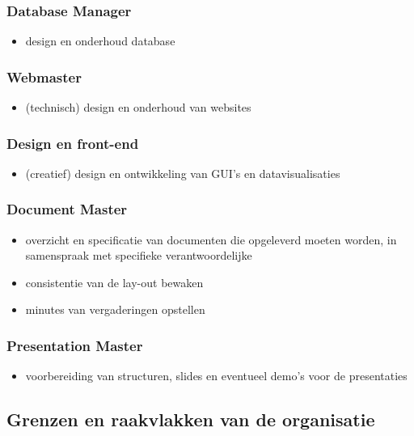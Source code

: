 \documentclass{article}
\begin{document}
\subsubsection*{Database Manager}
\begin{itemize}
\item design en onderhoud database
\end{itemize}

\subsubsection*{Webmaster}
\begin{itemize}
\item (technisch) design en onderhoud van websites
\end{itemize}

\subsubsection*{Design en front-end}
\begin{itemize}
\item (creatief) design en ontwikkeling van GUI's en datavisualisaties
\end{itemize}

\subsubsection*{Document Master}
\begin{itemize}
\item overzicht en specificatie van documenten die opgeleverd moeten worden, in samenspraak met specifieke verantwoordelijke 
\item consistentie van de lay-out bewaken
\item minutes van vergaderingen opstellen 
\end{itemize}

\subsubsection*{Presentation Master}
\begin{itemize}
\item voorbereiding van structuren, slides en eventueel demo's voor de presentaties
\end{itemize}


\subsection{Grenzen en raakvlakken van de organisatie}
\end{document}
